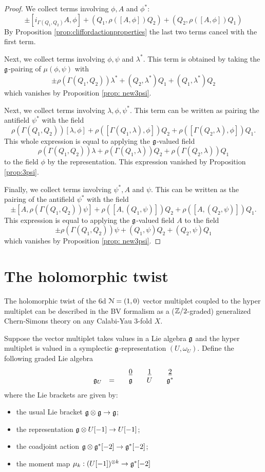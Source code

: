\documentclass[10pt, oneside]{article}
\begin{document}
\begin{proof}
We collect terms involving $\phi, A$ and $\phi^*$:
\[
\pm [i_{\Gamma(Q_1, Q_2)} A, \phi] + (Q_1, \rho([A,\phi])Q_2) + (Q_2, \rho([A,\phi])Q_1)
\]
By Proposition \ref{prop:cliffordactionproperties} the last two terms cancel with the first term. 

Next, we collect terms involving $\phi, \psi$ and $\lambda^*$. 
This term is obtained by taking the $\mathfrak g$-pairing of $\mu(\phi, \psi)$ with
\[
\pm \rho(\Gamma(Q_1,Q_2)) \lambda^* + (Q_2, \lambda^*)Q_1 + (Q_1, \lambda^*) Q_2
\]
which vanishes by Proposition \ref{prop: new3psi}.

Next, we collect terms involving $\lambda, \phi, \psi^*$.
This term can be written as pairing the antifield $\psi^*$ with the field
\[
\rho(\Gamma(Q_1,Q_2)) [\lambda, \phi] + \rho([\Gamma(Q_1,\lambda), \phi]) Q_2  + \rho([\Gamma(Q_2,\lambda), \phi]) Q_1. 
\]
This whole expression is equal to applying the $\mathfrak g$-valued field 
\[
\rho(\Gamma(Q_1,Q_2)) \lambda + \rho(\Gamma(Q_1,\lambda)) Q_2  + \rho(\Gamma(Q_2,\lambda)) Q_1
\]
to the field $\phi$ by the representation. 
This expression vanished by Proposition \ref{prop:3psi}.

Finally, we collect terms involving $\psi^*,A$ and $\psi$.
This can be written as the pairing of the antifield $\psi^*$ with the field
\[
\pm [A, \rho(\Gamma(Q_1,Q_2)) \psi] + \rho([A, (Q_1, \psi)]) Q_2 + \rho([A, (Q_2, \psi)]) Q_1 .
\] 
This expression is equal to applying the $\mathfrak g$-valued field $A$ to the field
\[
\pm \rho(\Gamma(Q_1,Q_2)) \psi + (Q_1, \psi) Q_2 + (Q_2, \psi) Q_1
\]
which vanishes by Proposition \ref{prop: new3psi}.


\end{proof}



\section{The holomorphic twist}

The holomorphic twist of the 6d $\mathcal N=(1,0)$ vector multiplet coupled to the hyper multiplet can be described in the BV formalism as a ($\mathbb Z/2$-graded) generalized Chern-Simons theory on any Calabi-Yau $3$-fold $X$. 

Suppose the vector multiplet takes values in a Lie algebra $\mathfrak g$ and the hyper multiplet is valued in a symplectic $\mathfrak g$-representation $(U,\omega_U)$. 
Define the following graded Lie algebra
\[
\begin{array}{ccccccccc}
&&& \underline{0}  & & \underline{1} & & \underline{2} \\
\mathfrak g_U & = && \mathfrak g & & U & & \mathfrak g^*
\end{array}
\]
where the Lie brackets are given by:
\begin{itemize}
\item the usual Lie bracket $\mathfrak g \otimes \mathfrak g \to \mathfrak g$;
\item the representation $\mathfrak g \otimes U[-1] \to U[-1]$;
\item the coadjoint action $\mathfrak g \otimes \mathfrak g^*[-2] \to \mathfrak g^*[-2]$;
\item the moment map $\mu_k : (U[-1])^{\otimes k} \to \mathfrak g^*[-2]$ 
\end{itemize}
\end{document}
